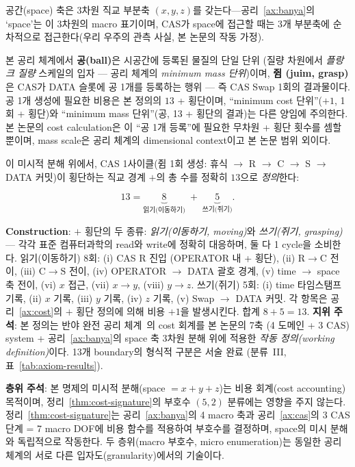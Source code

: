 \documentclass[entropy,article,submit,pdftex,oneauthor]{Definitions/mdpi}
\begin{document}
\begin{Definition}\label{lem:cost13}
공간(space) 축은 3차원 직교 부분축 $(x, y, z)$를 갖는다---공리~\ref{ax:banya}의 `space'는 이 3차원의 macro 표기이며, CAS가 space에 접근할 때는 3개 부분축에 순차적으로 접근한다(우리 우주의 관측 사실, 본 논문의 작동 가정).

본 공리 체계에서 \textbf{공(ball)}은 시공간에 등록된 물질의 단일 단위 (질량 차원에서 \emph{플랑크 질량} 스케일의 입자 — 공리 체계의 \emph{minimum mass 단위})이며, \textbf{쥠 (juim, grasp)}은 CAS가 DATA 슬롯에 공 1개를 등록하는 행위 — 즉 CAS Swap 1회의 결과물이다. 공 1개 생성에 필요한 비용은 본 정의의 $13$ + 횡단이며, ``minimum cost 단위''($+1$, 1회 + 횡단)와 ``minimum mass 단위''(공, 13 + 횡단의 결과)는 다른 양임에 주의한다. 본 논문의 cost calculation은 이 ``공 1개 등록''에 필요한 무차원 + 횡단 횟수를 셈할 뿐이며, mass scale은 공리 체계의 dimensional context이고 본 논문 범위 외이다.

이 미시적 분해 위에서, CAS 1사이클(쥠 1회 생성: 휴식 $\to$ R $\to$ C $\to$ S $\to$ DATA 커밋)이 횡단하는 직교 경계 $+$의 총 수를 정확히 $13$으로 \emph{정의}한다:
\begin{linenomath}
\begin{equation}
13 = \underbrace{8}_{\text{읽기(이동하기)}} \;+\; \underbrace{5}_{\text{쓰기(쥐기)}}.
\label{eq:cost13}
\end{equation}
\end{linenomath}
\textbf{Construction}: $+$ 횡단의 두 종류: \emph{읽기(이동하기, moving)}와 \emph{쓰기(쥐기, grasping)} — 각각 표준 컴퓨터과학의 read와 write에 정확히 대응하며, 둘 다 1 cycle을 소비한다. 읽기(이동하기) 8회: (i) CAS $\mathrm{R}$ 진입 (OPERATOR 내 + 횡단), (ii) $\mathrm{R} \to \mathrm{C}$ 전이, (iii) $\mathrm{C} \to \mathrm{S}$ 전이, (iv) OPERATOR $\to$ DATA 괄호 경계, (v) time $\to$ space 축 전이, (vi) $x$ 접근, (vii) $x \to y$, (viii) $y \to z$. 쓰기(쥐기) 5회: (i) time 타임스탬프 기록, (ii) $x$ 기록, (iii) $y$ 기록, (iv) $z$ 기록, (v) Swap $\to$ DATA 커밋. 각 항목은 공리~\ref{ax:cost}의 $+$ 횡단 정의에 의해 비용 $+1$을 발생시킨다. 합계 $8 + 5 = 13$.
\textbf{지위 주석}: 본 정의는 반야 완전 공리 체계~\cite{han2026}의 cost 회계를 본 논문의 7축 (4 도메인 + 3 CAS) system + 공리~\ref{ax:banya}의 space 축 3차원 분해 위에 적용한 \emph{작동 정의(working definition)}이다. 13개 boundary의 형식적 구분은 서술 완료 (분류~III, 표~\ref{tab:axiom-results}).
\end{Definition}

\textbf{층위 주석}: 본 명제의 미시적 분해(space $= x + y + z$)는 비용 회계(cost accounting) 목적이며, 정리~\ref{thm:cost-signature}의 부호수 $(5,2)$ 분류에는 영향을 주지 않는다. 정리~\ref{thm:cost-signature}는 공리~\ref{ax:banya}의 4 macro 축과 공리~\ref{ax:cas}의 3 CAS 단계 = 7 macro DOF에 비용 함수를 적용하여 부호수를 결정하며, space의 미시 분해와 독립적으로 작동한다. 두 층위(macro 부호수, micro enumeration)는 동일한 공리 체계의 서로 다른 입자도(granularity)에서의 기술이다.
\end{document}
